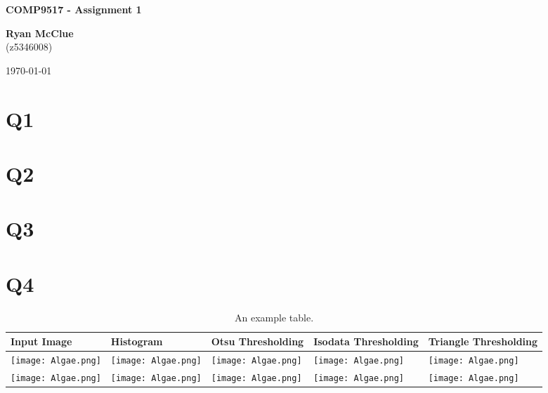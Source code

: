 \documentclass[11pt, english]{article}
\begin{document}
\thispagestyle{empty}
\begin{titlepage}
\begin{center}
  \centering
  
  \Huge \textbf{COMP9517 - Assignment 1} \\
  \vspace{5cm}
     
  \huge \textbf{Ryan McClue} \\
  (z5346008)
  \vspace{5cm}
    
  \today
\end{center}
\end{titlepage}

\section{Q1}
\section{Q2}
\section{Q3}
\section{Q4}
\begin{table}[ht]
\centering
\begin{tabularx}{\linewidth}{X|X|X|X|X}
Input Image & Histogram & Otsu Thresholding & Isodata Thresholding & Triangle Thresholding \\\hline
\texttt{[image: Algae.png]} & \texttt{[image: Algae.png]} & \texttt{[image: Algae.png]} & \texttt{[image: Algae.png]} & \texttt{[image: Algae.png]} \\
\texttt{[image: Algae.png]} & \texttt{[image: Algae.png]} & \texttt{[image: Algae.png]} & \texttt{[image: Algae.png]} & \texttt{[image: Algae.png]} \\

\end{tabularx}
\caption{An example table.}
\end{table}
\end{document}
